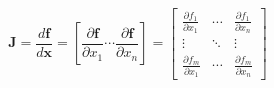     \begin{center}
        \begin{equation*}
            \mathbf{J}
            =
            \frac{d \mathbf{f}}{d \mathbf{x}}
            =
            \left[ \frac{\partial \mathbf{f}}{\partial x_1}
            \cdots \frac{\partial \mathbf{f}}{\partial x_n} \right]
            =
            \begin{bmatrix}
            \frac{\partial f_1}{\partial x_1} & \cdots &
            \frac{\partial f_1}{\partial x_n} \\
            \vdots & \ddots & \vdots \\
            \frac{\partial f_m}{\partial x_1} & \cdots &
            \frac{\partial f_m}{\partial x_n}
            \end{bmatrix}
        \end{equation*}
    \end{center}
